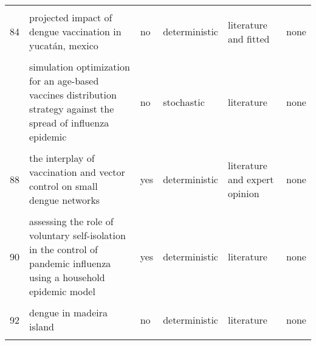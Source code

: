 \documentclass[
]{article}
\begin{document}
\begin{landscape}
\begin{longtable}{l>{\raggedright\arraybackslash}p{3cm}l>{\raggedright\arraybackslash}p{3cm}ll}
\cellcolor{gray!6}{83} & \cellcolor{gray!6}{predicting and evaluating the epidemic trend of ebola virus disease in the 2014-2015 outbreak and the effects of intervention measures} & \cellcolor{gray!6}{yes} & \cellcolor{gray!6}{deterministic} & \cellcolor{gray!6}{literature and fitted} & \cellcolor{gray!6}{data}\\
84 & projected impact of dengue vaccination in yucatán, mexico & no & deterministic & literature and fitted & none\\
\cellcolor{gray!6}{85} & \cellcolor{gray!6}{seasonality and the effectiveness of mass vaccination} & \cellcolor{gray!6}{no} & \cellcolor{gray!6}{deterministic} & \cellcolor{gray!6}{literature} & \cellcolor{gray!6}{none}\\
\addlinespace
86 & simulation optimization for an age-based vaccines distribution strategy against the spread of influenza epidemic & no & stochastic & literature & none\\
\cellcolor{gray!6}{87} & \cellcolor{gray!6}{spatiotemporal dynamics of the ebola epidemic in guinea and implications for vaccination and disease elimination: a computational modeling analysis} & \cellcolor{gray!6}{yes} & \cellcolor{gray!6}{stochastic} & \cellcolor{gray!6}{literature and fitted} & \cellcolor{gray!6}{data}\\
88 & the interplay of vaccination and vector control on small dengue networks & yes & deterministic & literature and expert opinion & none\\
\cellcolor{gray!6}{89} & \cellcolor{gray!6}{an epidemic patchy model with entry–exit screening} & \cellcolor{gray!6}{yes} & \cellcolor{gray!6}{deterministic} & \cellcolor{gray!6}{literature and fitted} & \cellcolor{gray!6}{none}\\
90 & assessing the role of voluntary self-isolation in the control of pandemic influenza using a household epidemic model & yes & deterministic & literature & none\\
\addlinespace
\cellcolor{gray!6}{91} & \cellcolor{gray!6}{be-codis: a mathematical model to predict the risk of human diseases spread between countries—validation and application to the 2014–2015 ebola virus disease epidemic} & \cellcolor{gray!6}{yes} & \cellcolor{gray!6}{both} & \cellcolor{gray!6}{literature and expert opinion and fitted} & \cellcolor{gray!6}{data}\\
92 & dengue in madeira island & no & deterministic & literature & none\\
\cellcolor{gray!6}{93} & \cellcolor{gray!6}{dynamic simulation of a seiqr-v epidemic model based on cellular automata} & \cellcolor{gray!6}{no} & \cellcolor{gray!6}{deterministic} & \cellcolor{gray!6}{expert opinion} & \cellcolor{gray!6}{data}\\

\end{longtable}
\end{landscape}
\end{document}
